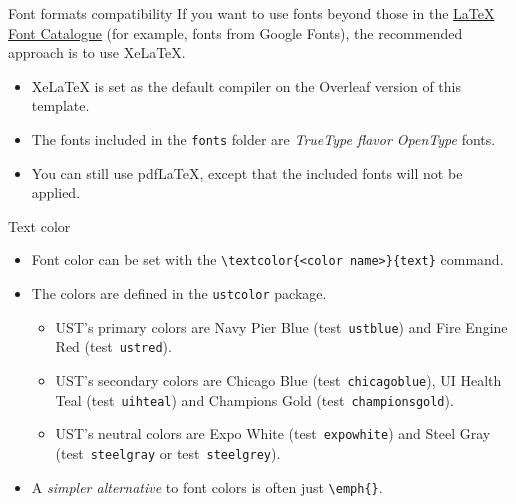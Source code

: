 \documentclass[]{beamer}
\newcommand{\hrefcol}[2]{\textcolor{uihteal}{\href{#1}{#2}}}
\newcommand{\testcolor}[1]{\colorbox{#1}{\textcolor{#1}{test}}~\texttt{#1}}
\begin{document}
\begin{frame}[fragile]{Font formats compatibility}
If you want to use fonts beyond those in the \hrefcol{https://tug.org/FontCatalogue/}{LaTeX Font Catalogue} (for example, fonts from Google Fonts), the recommended approach is to use XeLaTeX.
\begin{itemize}
\item XeLaTeX is set as the default compiler on the Overleaf version of this template.
\item The fonts included in the \verb|fonts| folder are \emph{TrueType flavor OpenType} fonts.
\item You can still use pdfLaTeX, except that the included fonts will not be applied.
\end{itemize}

\end{frame}


\begin{frame}[fragile]{Text color}
\begin{itemize}
\item Font color can be set with the \verb|\textcolor{<color name>}{text}| command.
\item The colors are defined in the \texttt{ustcolor} package.
  \begin{itemize}
  \item UST's primary colors are Navy Pier Blue (\testcolor{ustblue}) and Fire Engine Red (\testcolor{ustred}).
  \item UST's secondary colors are Chicago Blue (\testcolor{chicagoblue}), UI Health Teal (\testcolor{uihteal}) and Champions Gold (\testcolor{championsgold}).
  \item UST's neutral colors are Expo White (\testcolor{expowhite}) and Steel Gray (\testcolor{steelgray} or \testcolor{steelgrey}).
  \end{itemize}
\item A \emph{simpler alternative} to font colors is often just \verb|\emph{}|.
\end{itemize}
\end{frame}
\end{document}
